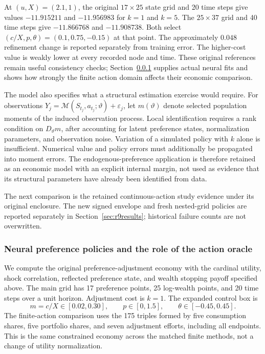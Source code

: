At $(u,X)=(2.1,1)$, the original $17\times25$ state grid and 20 time steps give values $-11.915211$ and $-11.956983$ for $k=1$ and $k=5$. The $25\times37$ grid and 40 time steps give $-11.866768$ and $-11.908738$. Both select $(c/X,p,\theta)=(0.1,0.75,-0.15)$ at that point. The approximately $0.048$ refinement change is reported separately from training error. The higher-cost value is weakly lower at every recorded node and time. These original references remain useful consistency checks; Section~\ref{sec:ndu-neural} supplies actual neural fits and shows how strongly the finite action domain affects their economic comparison.

The model also specifies what a structural estimation exercise would require. For observations $Y_j=\mathcal M(S_{t_j},a_{t_j};\vartheta)+\varepsilon_j$, let $m(\vartheta)$ denote selected population moments of the induced observation process. Local identification requires a rank condition on $D_\vartheta m$, after accounting for latent preference states, normalization parameters, and observation noise. Variation of a simulated policy with $k$ alone is insufficient. Numerical value and policy errors must additionally be propagated into moment errors. The endogenous-preference application is therefore retained as an economic model with an explicit internal margin, not used as evidence that its structural parameters have already been identified from data.

The next comparison is the retained continuous-action study evidence under its original enclosure. The new signed envelope and fresh nested-grid policies are reported separately in Section~\ref{sec:r9results}; historical failure counts are not overwritten.

\subsubsection{Neural preference policies and the role of the action oracle}\label{sec:ndu-neural}
We compute the original preference-adjustment economy with the cardinal utility, shock correlation, reflected preference state, and wealth stopping payoff specified above. The main grid has 17 preference points, 25 log-wealth points, and 20 time steps over a unit horizon. Adjustment cost is $k=1$. The expanded control box is
\[
 m=c/X\in[0.02,0.30],\qquad p\in[0,1.5],\qquad\theta\in[-0.45,0.45].
\]
The finite-action comparison uses the 175 triples formed by five consumption shares, five portfolio shares, and seven adjustment efforts, including all endpoints. This is the same constrained economy across the matched finite methods, not a change of utility normalization.

